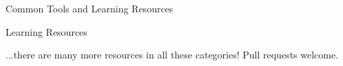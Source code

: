 \begin{block}{Common Tools and Learning Resources}
\begin{subblock}{ \hfill Learning Resources\hfill {}}
\end{subblock}

 ...there are many more resources in all these categories! Pull requests welcome.   
   

\end{block}